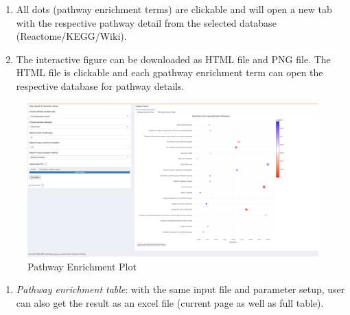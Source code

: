 \documentclass[
  a4paper,
  oneside,
  open=any]{scrreport}
\providecommand{\tightlist}{%
  \setlength{\itemsep}{0pt}\setlength{\parskip}{0pt}}\usepackage{longtable,booktabs,array}
\begin{document}
\begin{tcolorbox}[enhanced jigsaw, left=2mm, colback=white, breakable, leftrule=.75mm, coltitle=black, toprule=.15mm, rightrule=.15mm, colbacktitle=quarto-callout-note-color!10!white, title=\textcolor{quarto-callout-note-color}{\faInfo}\hspace{0.5em}{Note}, opacitybacktitle=0.6, colframe=quarto-callout-note-color-frame, bottomrule=.15mm, bottomtitle=1mm, toptitle=1mm, titlerule=0mm, opacityback=0, arc=.35mm]

\begin{enumerate}
\def\labelenumi{\arabic{enumi}.}
\tightlist
\item
  All dots (pathway enrichment terms) are clickable and will open a new
  tab with the respective pathway detail from the selected database
  (Reactome/KEGG/Wiki).
\item
  The interactive figure can be downloaded as HTML file and PNG file.
  The HTML file is clickable and each gpathway enrichment term can open
  the respective database for pathway details.
\end{enumerate}

\end{tcolorbox}

\begin{figure}[H]

{\centering \includegraphics{./_images/Pathway-Enrichment.png}

}

\caption{Pathway Enrichment Plot}

\end{figure}

\begin{enumerate}
\def\labelenumi{\arabic{enumi}.}
\setcounter{enumi}{1}
\tightlist
\item
  \emph{Pathway enrichment table}: with the same input file and
  parameter setup, user can also get the result as an excel file
  (current page as well as full table).\\
\end{enumerate}
\end{document}
